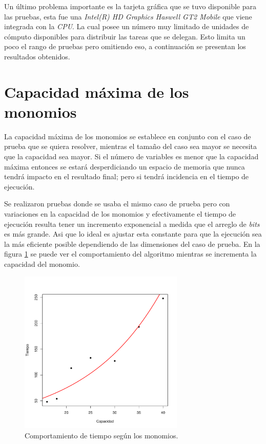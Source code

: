 Un último problema importante es la tarjeta gráfica que se tuvo disponible para las pruebas, esta fue una \textit{Intel(R) HD Graphics Haswell GT2 Mobile} que viene integrada con la \textit{CPU}. La cual posee un número muy limitado de unidades de cómputo disponibles para distribuir las tareas que se delegan. Esto limita un poco el rango de pruebas pero omitiendo eso, a continuación se presentan los resultados obtenidos.

\section{Capacidad máxima de los monomios}

La capacidad máxima de los monomios se establece en conjunto con el caso de prueba que se quiera resolver, mientras el tamaño del caso sea mayor se necesita que la capacidad sea mayor. Si el número de variables es menor que la capacidad máxima entonces se estará desperdiciando un espacio de memoria que nunca tendrá impacto en el resultado final; pero si tendrá incidencia en el tiempo de ejecución.

Se realizaron pruebas donde se usaba el mismo caso de prueba pero con variaciones en la capacidad de los monomios y efectivamente el tiempo de ejecución resulta tener un incremento exponencial a medida que el arreglo de \textit{bits} es más grande. Asi que lo ideal es ajustar esta constante para que la ejecución sea la más eficiente posible dependiendo de las dimensiones del caso de prueba. En la figura \ref{fig:time} se puede ver el comportamiento del algoritmo mientras se incrementa la capacidad del monomio.

\begin{figure}[!ht]
    \centering
    \includegraphics[width=0.7\textwidth,height=\textheight,keepaspectratio]{capacity_time.pdf}
    \caption{Comportamiento de tiempo según los monomios.}
    \label{fig:time}
\end{figure}

